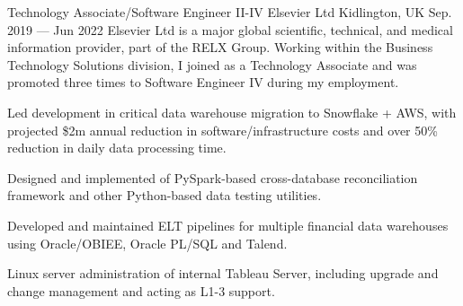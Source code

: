 \begin{cventries}
{    }
  \cventry
    {Technology Associate/Software Engineer II-IV}
    {Elsevier Ltd}
    {Kidlington, UK}
    {Sep. 2019 --- Jun 2022}
    Elsevier Ltd is a major global scientific, technical, and medical information provider, part of the RELX Group.
    Working within the Business Technology Solutions division, I joined as a Technology Associate and was
    promoted three times to Software Engineer IV during my employment.
    {
      \begin{cvitems}
      \item{Led development in critical data warehouse migration to Snowflake + AWS, with projected \$2m annual reduction in software/infrastructure costs and over 50\% reduction in daily data processing time.}
      \item{Designed and implemented of PySpark-based cross-database reconciliation framework and other Python-based data testing utilities.}
      \item{Developed and maintained ELT pipelines for multiple financial data warehouses using Oracle/OBIEE, Oracle PL/SQL and Talend.}
      \item{Linux server administration of internal Tableau Server, including upgrade and change management and acting as L1-3 support.}
      \end{cvitems}
    }


\end{cventries}
